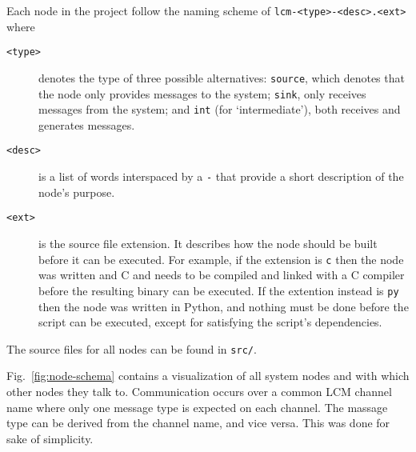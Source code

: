 Each node in the project follow the naming scheme of \texttt{lcm-<type>-<desc>.<ext>} where
\begin{description}
\item[\texttt{<type>}] denotes the type of three possible alternatives:
  \texttt{source}, which denotes that the node only provides messages to the system;
  \texttt{sink}, only receives messages from the system; and
  \texttt{int} (for `intermediate'), both receives and generates messages.
\item[\texttt{<desc>}] is a list of words interspaced by a \texttt{-} that provide a short description of the node's purpose.
\item[\texttt{<ext>}] is the source file extension. It describes how the node should be built before it can be executed.
  For example, if the extension is \texttt{c} then the node was written and C and needs to be compiled and linked with a C compiler before the resulting binary can be executed.
  If the extention instead is \texttt{py} then the node was written in Python, and nothing must be done before the script can be executed,
  except for satisfying the script's dependencies.
\end{description}

The source files for all nodes can be found in \texttt{src/}.

Fig.~\ref{fig:node-schema} contains a visualization of all system nodes and with which other nodes they talk to.
Communication occurs over a common LCM channel name where only one message type is expected on each channel.
The massage type can be derived from the channel name, and vice versa.
This was done for sake of simplicity.

